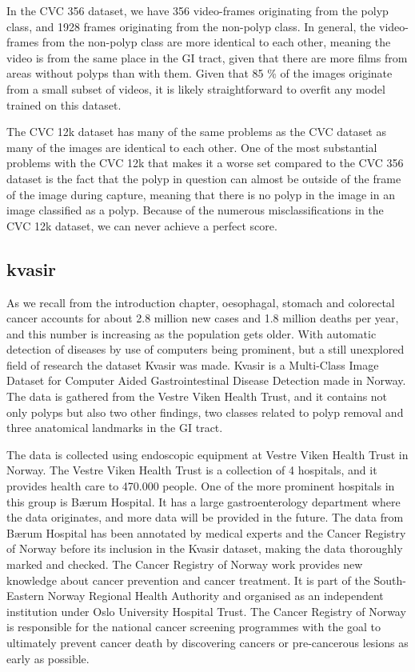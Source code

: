 In the CVC 356 dataset, we have 356 video-frames originating from the polyp class, and 1928 frames originating from the non-polyp class. 
In general, the video-frames from the non-polyp class are more identical to each other, meaning the video is from the same place in the GI tract, given that there are more films from areas without polyps than with them. 
Given that 85 \% of the images originate from a small subset of videos, it is likely straightforward to overfit any model trained on this dataset.


The CVC 12k dataset has many of the same problems as the CVC dataset as many of the images are identical to each other. One of the most substantial problems with the CVC 12k  that makes it a worse set compared to the CVC 356 dataset is the fact that the polyp in question can almost be outside of the frame of the image during capture, meaning that there is no polyp in the image in an image classified as a polyp. Because of the numerous misclassifications in the CVC 12k dataset, we can never achieve a perfect score.
 





\iffalse

\subsection{kvasir}


As we recall from the introduction chapter, oesophagal, stomach and colorectal cancer accounts for about 2.8 million new cases and 1.8 million deaths per year, and this number is increasing as the population gets older.   With automatic detection of diseases by use of computers being prominent, but a still unexplored field of research the dataset Kvasir was made.
Kvasir is a Multi-Class Image Dataset for Computer Aided Gastrointestinal Disease Detection made in Norway. The data is gathered from the Vestre Viken Health Trust, and it contains not only polyps but also two other findings, two classes related to polyp removal and three anatomical landmarks in the GI tract.

The data is collected using endoscopic equipment at Vestre Viken Health Trust in Norway. The Vestre Viken Health Trust is a collection of 4 hospitals, and it provides health care to 470.000 people.
One of the more prominent hospitals in this group is Bærum Hospital. It has a large gastroenterology department where the data originates, and more data will be provided in the future. The data from Bærum Hospital has been annotated by medical experts and the Cancer Registry of Norway before its inclusion in the Kvasir dataset, making the data thoroughly marked and checked.
The Cancer Registry of Norway work provides new knowledge about cancer prevention and cancer treatment. It is part of the South-Eastern Norway Regional Health Authority and organised as an independent institution under Oslo University Hospital Trust. The Cancer Registry of Norway is responsible for the national cancer screening programmes with the goal to ultimately prevent cancer death by discovering cancers or pre-cancerous lesions as early as possible. 

